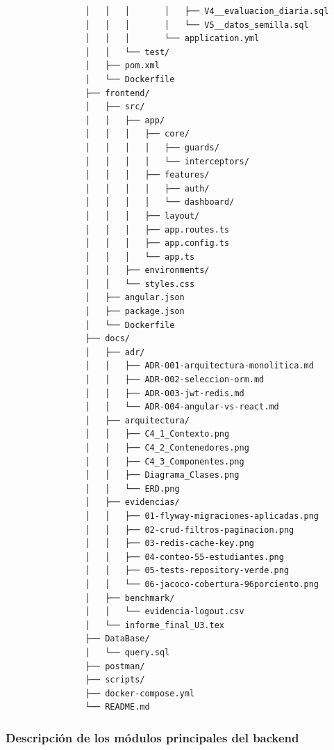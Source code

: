 \documentclass[12pt]{article}
\begin{document}
\begin{mdframed}[linecolor=gray!40, backgroundcolor=gray!5, linewidth=1pt]
\begin{ttfamily}
\begin{verbatim}
				│   │   │       │   ├── V4__evaluacion_diaria.sql
				│   │   │       │   └── V5__datos_semilla.sql
				│   │   │       └── application.yml
				│   │   └── test/
				│   ├── pom.xml
				│   └── Dockerfile
				├── frontend/
				│   ├── src/
				│   │   ├── app/
				│   │   │   ├── core/
				│   │   │   │   ├── guards/
				│   │   │   │   └── interceptors/
				│   │   │   ├── features/
				│   │   │   │   ├── auth/
				│   │   │   │   └── dashboard/
				│   │   │   ├── layout/
				│   │   │   ├── app.routes.ts
				│   │   │   ├── app.config.ts
				│   │   │   └── app.ts
				│   │   ├── environments/
				│   │   └── styles.css
				│   ├── angular.json
				│   ├── package.json
				│   └── Dockerfile
				├── docs/
				│   ├── adr/
				│   │   ├── ADR-001-arquitectura-monolitica.md
				│   │   ├── ADR-002-seleccion-orm.md
				│   │   ├── ADR-003-jwt-redis.md
				│   │   └── ADR-004-angular-vs-react.md
				│   ├── arquitectura/
				│   │   ├── C4_1_Contexto.png
				│   │   ├── C4_2_Contenedores.png
				│   │   ├── C4_3_Componentes.png
				│   │   ├── Diagrama_Clases.png
				│   │   └── ERD.png
				│   ├── evidencias/
				│   │   ├── 01-flyway-migraciones-aplicadas.png
				│   │   ├── 02-crud-filtros-paginacion.png
				│   │   ├── 03-redis-cache-key.png
				│   │   ├── 04-conteo-55-estudiantes.png
				│   │   ├── 05-tests-repository-verde.png
				│   │   └── 06-jacoco-cobertura-96porciento.png
				│   ├── benchmark/
				│   │   └── evidencia-logout.csv
				│   └── informe_final_U3.tex
				├── DataBase/
				│   └── query.sql
				├── postman/
				├── scripts/
				├── docker-compose.yml
				└── README.md
			\end{verbatim}
		\end{ttfamily}
	\end{mdframed}
	
	\subsubsection*{Descripción de los módulos principales del backend}
	
\end{document}
